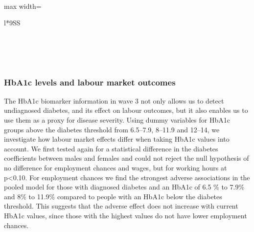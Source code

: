 \documentclass[12pt,english,british]{article}
\newcommand{\sym}[1]{\ensuremath{^{#1}}} %
\begin{document}
\begin{table}[h!]
\begin{center}
\begin{adjustbox}{max width=\textwidth}
{\begin{tabular}{l*{9}{SS}}
\\
\\
\\
\\ \multicolumn{10}{l}{\footnotesize \sym{*} \(p<0.10\), \sym{**} \(p<0.05\), \sym{***} \(p<0.01\)}\\ 
\end{tabular}%
}
\end{adjustbox}
\end{center}
\caption{\label{tab:Self-reported-diabetes-and-1}\textbf{Self-reported diabetes and undiagnosed diabetes and labour market outcomes}}
\end{table}
  
  
  
  
  
  
  
  
  
  
  
  
  
  
  
  

\subsubsection{HbA1c levels and labour market outcomes}

The \ac{HbA1c} biomarker information in wave 3 not only allows
us to detect undiagnosed diabetes, and its effect on labour outcomes,
but it also enables us to use them as a proxy for disease
severity. Using dummy variables for \ac{HbA1c} groups above the
diabetes threshold from 6.5--7.9, 8--11.9 and 12--14, we investigate
how labour market effects differ when taking \ac{HbA1c} values
into account. We first tested again for a statistical difference in
the diabetes coefficients between males and females and could not
reject the null hypothesis of no difference for employment chances
and wages, but for working hours at p<0.10. For employment chances
we find the strongest adverse associations in the pooled model for
those with diagnosed diabetes and an \ac{HbA1c} of 6.5 \% to 7.9\%
and 8\% to 11.9\% compared to people with an \ac{HbA1c} below the
diabetes threshold. This suggests that the adverse effect does not
increase with current \ac{HbA1c} values, since those with the highest
values do not have lower employment chances. 
\end{document}
